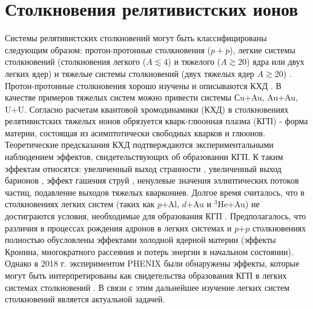 
\chapter{Столкновения релятивистских ионов} \label{ch:ch1}
Системы релятивистских столкновений могут быть классифицированы следующим образом: протон-протонные столкновения ($p+p$), легкие системы столкновений (столкновения легкого ($A \lesssim 4$) и тяжелого ($A \gtrsim 20$) ядра или двух легких ядер) и тяжелые системы столкновений (двух тяжелых ядер $A \gtrsim 20$) \cite{QGP, Shmatov}. Протон-протонные столкновения хорошо изучены и описываются КХД \cite{CH_pp,PHENIX_Nature}. В качестве примеров тяжелых систем можно привести системы Сu+Au, Au+Au, U+U. Согласно расчетам квантовой хромодинамики (КХД) в столкновениях релятивистских тяжелых ионов обрязуется кварк-глюонная плазма (КГП) - форма материи, состоящая из асимптотически свободных кварков и глюонов. Теоретические предсказания КХД подтверждаются экспериментальными наблюдением эффектов, свидетельствующих об образовании КГП. К таким эффектам относятся: увеличенный выход странности \cite{StrangEnh, Strangeness_QGP}, увеличенный выход барионов \cite{BaryonPuzzleHeavy,p2piRatio_2003,p2piRatio_130GeV}, эффект гашения струй \cite{JetQuenching1, JetQuenching2, JetQuenching3}, ненулевые значения эллиптических потоков частиц, подавление выходов тяжелых кваркониев. Долгое время считалось, что в столкновениях легких систем (таких как $p$+Al, $d$+Au и $^3$He+Au) не достиграются условия, необходимые для образования КГП \cite{CNM, PHENIX_Nature}. Предполагалось, что различия в процессах рождения адронов в легких системах и $p$+$p$ столкновениях полностью обусловлены эффектами холодной ядерной материи \cite{CNM} (эффекты Кронина, многократного рассеяния и потерь энергии в начальном состоянии). Однако в 2018 г. экспериментом PHENIX были обнаружены эффекты, которые могут быть интерпретированы как свидетельства образования КГП в легких системах столкновений \cite{PHENIX_Nature}. В связи с этим дальнейшее изучение легких систем столкновений является актуальной задачей. 

